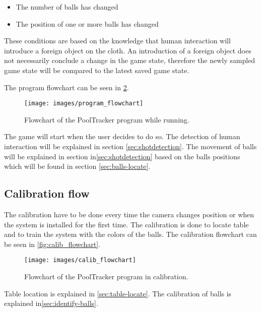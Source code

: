 \begin{itemize}
	\item The number of balls has changed
	\item The position of one or more balls has changed
\end{itemize}

These conditions are based on the knowledge that human interaction will introduce a foreign object on the cloth.  An introduction of a foreign object does not necessarily conclude a change in the game state, therefore the newly sampled game state will be compared to the latest saved game state.

The program flowchart can be seen in \ref{fig:program_flowchart}.\\

\begin{figure}[H]
\begin{center}
\leavevmode
\texttt{[image: images/program\_flowchart]}
\end{center}
\caption{Flowchart of the PoolTracker program while running.}
\label{fig:program_flowchart}
\end{figure}

The game will start when the user decides to do so. The detection of human interaction will be explained in section \ref{sec:shotdetection}. The movement of balls will be explained in section in\ref{sec:shotdetection} based on the balls positions which will be found in section \ref{sec:balls-locate}.

\subsection{Calibration flow}
The calibration have to be done every time the camera changes position or when the system is installed for the first time. The calibration is done to locate table and to train the system with the colors of the balls. The calibration flowchart can be seen in \ref{fig:calib_flowchart}.\\

\begin{figure}[H]
\begin{center}
\leavevmode
\texttt{[image: images/calib\_flowchart]}
\end{center}
\caption{Flowchart of the PoolTracker program in calibration.}
\label{fig:program_flowchart}
\end{figure}

Table location is explained in \ref{sec:table-locate}. The calibration of balls is explained in\ref{sec:identify-balls}.


